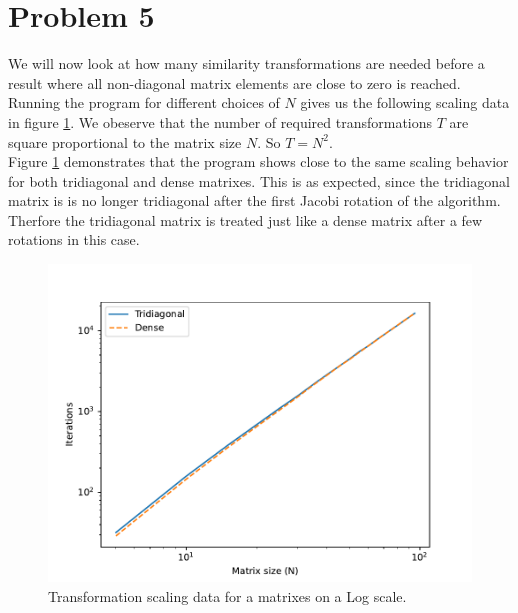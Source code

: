 \documentclass[english,notitlepage]{revtex4-1}  %
\begin{document}
\section*{Problem 5}
We will now look at how many similarity transformations are needed 
before a result where all non-diagonal matrix elements 
are close to zero is reached. \\

Running the program for different choices of $N$
gives us the following scaling data in figure \ref{fig:N_iter_log_both}.
We obeserve that the number of required transformations $T$ are 
square proportional to the matrix size $N$. So $T = N^2$. \\

Figure \ref{fig:N_iter_log_both} demonstrates that the program shows close to
the same scaling behavior for both tridiagonal and dense matrixes. 
This is as expected, since the tridiagonal matrix is is 
no longer tridiagonal after the first Jacobi rotation of the algorithm. 
Therfore the tridiagonal matrix is treated just like a dense matrix after a few
rotations in this case.

\begin{figure}[H]
    \centering
    \includegraphics[width=1.\textwidth]{../figures/N_iter_log_both.pdf}
    \caption{Transformation scaling data for a matrixes on a Log scale.}
    \label{fig:N_iter_log_both}
\end{figure}


\newpage
\end{document}
